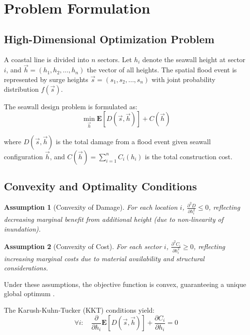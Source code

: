 \documentclass[3p,twocolumn]{elsarticle}
\newtheorem{assumption}{Assumption}[section]
\begin{document}
\section{Problem Formulation}

\subsection{High-Dimensional Optimization Problem}

A coastal line is divided into $n$ sectors. Let $h_i$ denote the seawall height at sector $i$, and $\vec{h} = (h_1, h_2, \ldots, h_n)$ the vector of all heights. The spatial flood event is represented by surge heights $\vec{s} = (s_1, s_2, \ldots, s_n)$ with joint probability distribution $f(\vec{s})$.

The seawall design problem is formulated as:
\begin{equation}
\min_{\vec{h}} \mathbf{E}[D(\vec{s}, \vec{h})] + C(\vec{h})
\label{eq:main_problem}
\end{equation}

where $D(\vec{s}, \vec{h})$ is the total damage from a flood event given seawall configuration $\vec{h}$, and $C(\vec{h}) = \sum_{i=1}^n C_i(h_i)$ is the total construction cost.

\subsection{Convexity and Optimality Conditions}

\begin{assumption}[Convexity of Damage]
\label{assum:convex_damage}
For each location $i$, $\frac{\partial^2 D}{\partial h_i^2} \leq 0$, reflecting decreasing marginal benefit from additional height (due to non-linearity of inundation).
\end{assumption}

\begin{assumption}[Convexity of Cost]
\label{assum:convex_cost}
For each sector $i$, $\frac{\partial^2 C_i}{\partial h_i^2} \geq 0$, reflecting increasing marginal costs due to material availability and structural considerations.
\end{assumption}

Under these assumptions, the objective function is convex, guaranteeing a unique global optimum \cite{boyd2004convex}.

The Karush-Kuhn-Tucker (KKT) conditions yield:
\begin{equation}
\forall i: \quad \frac{\partial}{\partial h_i}\mathbf{E}[D(\vec{s}, \vec{h})] + \frac{\partial C_i}{\partial h_i} = 0
\label{eq:optimality}
\end{equation}
\end{document}
